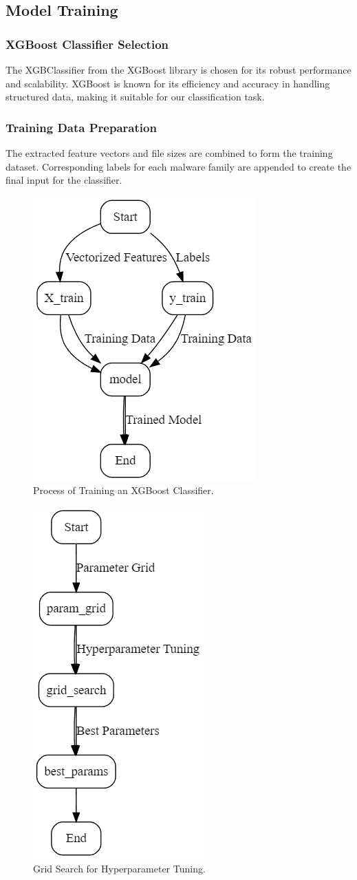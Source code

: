 \documentclass[conference]{IEEEtran}
\begin{document}
\subsection{Model Training}
\subsubsection{XGBoost Classifier Selection}
The XGBClassifier from the XGBoost library is chosen for its robust performance and scalability. XGBoost is known for its efficiency and accuracy in handling structured data, making it suitable for our classification task.

\subsubsection{Training Data Preparation}
The extracted feature vectors and file sizes are combined to form the training dataset. Corresponding labels for each malware family are appended to create the final input for the classifier.

\begin{figure}[h]
    \centerline{\includegraphics[width=0.4\linewidth]{fig2.png}}
    \caption{Process of Training an XGBoost Classifier.}
    \label{fig2}
\end{figure}

\begin{figure}[H]
    \centerline{\includegraphics[width=0.4\linewidth]{fig3.png}}
    \caption{Grid Search for Hyperparameter Tuning.}
    \label{fig3}
\end{figure}
\end{document}
